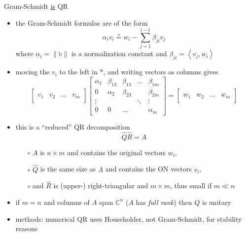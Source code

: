 \documentclass[10pt,hyperref]{beamer}
\newcommand{\CC}{\mathbb{C}}
\newcommand{\ip}[2]{\left<#1,#2\right>}
\newcommand{\trefmatrixthree}[3]{\left[\begin{array}{c|c|c|c} & & & \\ #1 & #2 & \dots & #3 \\ & & & \end{array}\right]}
\begin{document}
\begin{frame}{Gram-Schmidt \underline{is} QR}

\begin{itemize}
\item the Gram-Schmidt formulas are of the form
\small
    $$\alpha_i v_i \stackrel{\ast}{=} w_i - \sum_{j=1}^{i-1} \beta_{ji} v_j$$
\normalsize
where $\alpha_i=\|\tilde v\|$ is a normalization constant and $\beta_{ji}=\ip{v_j}{w_i}$
\item moving the $v_i$ to the left in $\ast$, and writing vectors as columns gives
\small
    $$\trefmatrixthree{v_1}{v_2}{v_m}
      \begin{bmatrix} \alpha_1 & \beta_{12} & \beta_{13} & \dots & \beta_{1m} \\
                      0        & \alpha_2   & \beta_{23} &       & \beta_{2m} \\
                      \vdots   &            &            & \ddots & \vdots \\
                      0        & 0          & \dots      &       & \alpha_m \end{bmatrix}
      = \trefmatrixthree{w_1}{w_2}{w_m}$$
\normalsize
\item this is a ``reduced'' QR decomposition
    $$\hat Q \hat R = A$$

\vspace{-1mm}
    \begin{itemize}
    \item[$\circ$] $A$ is $n\times m$ and contains the original vectors $w_i$,
    \item[$\circ$] $\hat Q$ is the same size as $A$ and contains the ON vectors $v_i$,
    \item[$\circ$] and  $\hat R$ is (upper-) right-triangular and $m\times m$, thus small if $m\ll n$
    \end{itemize}
\item if $m=n$ and columns of $A$ span $\CC^n$ ($A$ has \emph{full rank}) then $Q$ is unitary

\medskip
\footnotesize
\item methods: numerical QR uses Householder, not Gram-Schmidt, for stability reasons
\end{itemize}
\end{frame}
\end{document}
